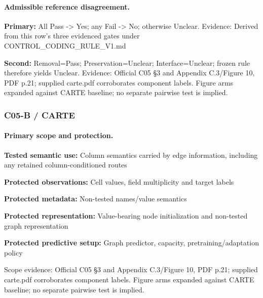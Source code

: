 \documentclass[10pt]{article}
\begin{document}
\paragraph{Admissible reference disagreement.}
\textbf{Primary:} All Pass -> Yes; any Fail -> No; otherwise Unclear. Evidence: Derived from this row’s three evidenced gates under CONTROL\_CODING\_RULE\_V1.md\par
\textbf{Second:} Removal=Pass; Preservation=Unclear; Interface=Unclear; frozen rule therefore yields Unclear. Evidence: Official C05 §3 and Appendix C.3/Figure 10, PDF p.21; supplied carte.pdf corroborates component labels. Figure arms expanded against CARTE baseline; no separate pairwise test is implied.\par
\subsubsection*{C05-B / CARTE}
\paragraph{Primary scope and protection.}
\textbf{Tested semantic use:} Column semantics carried by edge information, including any retained column-conditioned routes\par
\textbf{Protected observations:} Cell values, field multiplicity and target labels\par
\textbf{Protected metadata:} Non-tested names/value semantics\par
\textbf{Protected representation:} Value-bearing node initialization and non-tested graph representation\par
\textbf{Protected predictive setup:} Graph predictor, capacity, pretraining/adaptation policy\par
Scope evidence: Official C05 §3 and Appendix C.3/Figure 10, PDF p.21; supplied carte.pdf corroborates component labels. Figure arms expanded against CARTE baseline; no separate pairwise test is implied.\par
\end{document}
